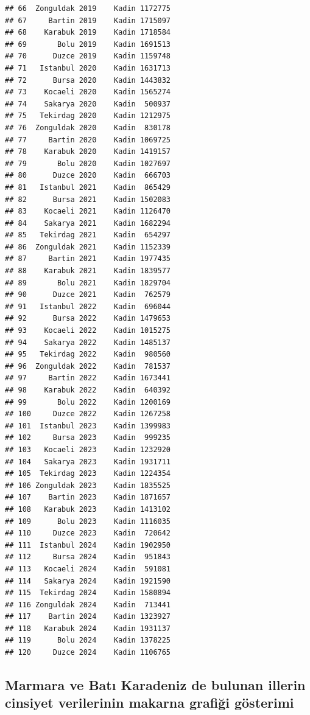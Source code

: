 \documentclass[
]{article}
\begin{document}
\begin{verbatim}
## 66  Zonguldak 2019    Kadin 1172775
## 67     Bartin 2019    Kadin 1715097
## 68    Karabuk 2019    Kadin 1718584
## 69       Bolu 2019    Kadin 1691513
## 70      Duzce 2019    Kadin 1159748
## 71   Istanbul 2020    Kadin 1631713
## 72      Bursa 2020    Kadin 1443832
## 73    Kocaeli 2020    Kadin 1565274
## 74    Sakarya 2020    Kadin  500937
## 75   Tekirdag 2020    Kadin 1212975
## 76  Zonguldak 2020    Kadin  830178
## 77     Bartin 2020    Kadin 1069725
## 78    Karabuk 2020    Kadin 1419157
## 79       Bolu 2020    Kadin 1027697
## 80      Duzce 2020    Kadin  666703
## 81   Istanbul 2021    Kadin  865429
## 82      Bursa 2021    Kadin 1502083
## 83    Kocaeli 2021    Kadin 1126470
## 84    Sakarya 2021    Kadin 1682294
## 85   Tekirdag 2021    Kadin  654297
## 86  Zonguldak 2021    Kadin 1152339
## 87     Bartin 2021    Kadin 1977435
## 88    Karabuk 2021    Kadin 1839577
## 89       Bolu 2021    Kadin 1829704
## 90      Duzce 2021    Kadin  762579
## 91   Istanbul 2022    Kadin  696044
## 92      Bursa 2022    Kadin 1479653
## 93    Kocaeli 2022    Kadin 1015275
## 94    Sakarya 2022    Kadin 1485137
## 95   Tekirdag 2022    Kadin  980560
## 96  Zonguldak 2022    Kadin  781537
## 97     Bartin 2022    Kadin 1673441
## 98    Karabuk 2022    Kadin  640392
## 99       Bolu 2022    Kadin 1200169
## 100     Duzce 2022    Kadin 1267258
## 101  Istanbul 2023    Kadin 1399983
## 102     Bursa 2023    Kadin  999235
## 103   Kocaeli 2023    Kadin 1232920
## 104   Sakarya 2023    Kadin 1931711
## 105  Tekirdag 2023    Kadin 1224354
## 106 Zonguldak 2023    Kadin 1835525
## 107    Bartin 2023    Kadin 1871657
## 108   Karabuk 2023    Kadin 1413102
## 109      Bolu 2023    Kadin 1116035
## 110     Duzce 2023    Kadin  720642
## 111  Istanbul 2024    Kadin 1902950
## 112     Bursa 2024    Kadin  951843
## 113   Kocaeli 2024    Kadin  591081
## 114   Sakarya 2024    Kadin 1921590
## 115  Tekirdag 2024    Kadin 1580894
## 116 Zonguldak 2024    Kadin  713441
## 117    Bartin 2024    Kadin 1323927
## 118   Karabuk 2024    Kadin 1931137
## 119      Bolu 2024    Kadin 1378225
## 120     Duzce 2024    Kadin 1106765
\end{verbatim}

\subsection{Marmara ve Batı Karadeniz de bulunan illerin cinsiyet
verilerinin makarna grafiği
gösterimi}\label{marmara-ve-batux131-karadeniz-de-bulunan-illerin-cinsiyet-verilerinin-makarna-grafiux11fi-guxf6sterimi}
\end{document}
